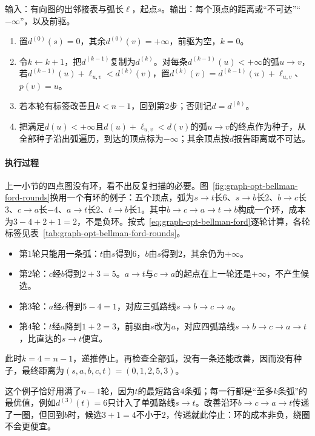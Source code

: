 \begin{algorithm}
\label{alg:graph-opt-bellman-ford}
输入：有向图的出邻接表与弧长$\ell$，起点$s$。输出：每个顶点的距离或“不可达”“$-\infty$”，以及前驱。
\begin{enumerate}
  \item 置$d^{(0)}(s)=0$，其余$d^{(0)}(v)=+\infty$，前驱为空，$k=0$。
  \item 令$k\gets k+1$，把$d^{(k-1)}$复制为$d^{(k)}$。对每条$d^{(k-1)}(u)<+\infty$的弧$u\to v$，若$d^{(k-1)}(u)+\ell_{u,v}<d^{(k)}(v)$，置$d^{(k)}(v)=d^{(k-1)}(u)+\ell_{u,v}$、$p(v)=u$。
  \item 若本轮有标签改善且$k<n-1$，回到第2步；否则记$d=d^{(k)}$。
  \item 把满足$d(u)<+\infty$且$d(u)+\ell_{u,v}<d(v)$的弧$u\to v$的终点作为种子，从全部种子沿出弧遍历，到达的顶点标为$-\infty$；其余顶点按$d$报告距离或不可达。
\end{enumerate}
\end{algorithm}

\paragraph{执行过程}
上一小节的四点图没有环，看不出反复扫描的必要。图~\ref{fig:graph-opt-bellman-ford-rounds}换用一个有环的例子：五个顶点，弧为$s\to t$长$6$、$s\to b$长$2$、$b\to c$长$3$、$c\to a$长$-4$、$a\to t$长$2$、$t\to b$长$1$。其中$b\to c\to a\to t\to b$构成一个环，成本为$3-4+2+1=2$，不是负环。按式~\eqref{eq:graph-opt-bellman-ford}逐轮计算，各轮标签见表~\ref{tab:graph-opt-bellman-ford-rounds}。
\begin{itemize}
  \item 第$1$轮只能用一条弧：$t$由$s$得到$6$，$b$由$s$得到$2$，其余仍为$+\infty$。
  \item 第$2$轮：$c$经$b$得到$2+3=5$。$a\to t$与$c\to a$的起点在上一轮还是$+\infty$，不产生候选。
  \item 第$3$轮：$a$经$c$得到$5-4=1$，对应三弧路线$s\to b\to c\to a$。
  \item 第$4$轮：$t$经$a$降到$1+2=3$，前驱由$s$改为$a$，对应四弧路线$s\to b\to c\to a\to t$，比直达的$s\to t$便宜。
\end{itemize}
此时$k=4=n-1$，递推停止。再检查全部弧，没有一条还能改善，因而没有种子，最终距离为$(s,a,b,c,t)=(0,1,2,5,3)$。

这个例子恰好用满了$n-1$轮，因为$t$的最短路含$4$条弧；每一行都是“至多$k$条弧”的最优值，例如$d^{(3)}(t)=6$只计入了单弧路线$s\to t$。改善沿环$b\to c\to a\to t$传递了一圈，但回到$b$时，候选$3+1=4$不小于$2$，传递就此停止：环的成本非负，绕圈不会更便宜。

